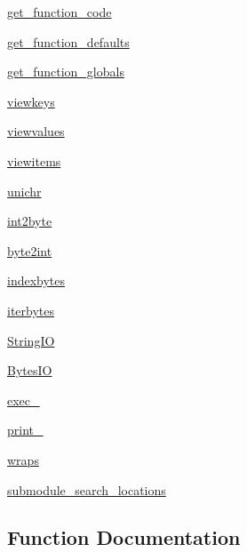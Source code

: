 \begin{DoxyCompactItemize}
\item 
\hyperlink{namespacesix_a17cf3556b07a902733cf8694ccc8c620}{get\+\_\+function\+\_\+code}
\item 
\hyperlink{namespacesix_ad0b187b39865ce712b907f81e1f0d744}{get\+\_\+function\+\_\+defaults}
\item 
\hyperlink{namespacesix_acccb7a0407196b6b1fe0ce76ba93d7a7}{get\+\_\+function\+\_\+globals}
\item 
\hyperlink{namespacesix_ad2206e5e921294fa8eb626bc615e0395}{viewkeys}
\item 
\hyperlink{namespacesix_a71eb4fded7f75b30633e42a157585284}{viewvalues}
\item 
\hyperlink{namespacesix_abb1f58c1fd2e77496261e70f4ce871d6}{viewitems}
\item 
\hyperlink{namespacesix_a32dbc25df1cde32d5c59d7cbfa63ddc1}{unichr}
\item 
\hyperlink{namespacesix_a84f0a486bede297c97d3534c8592673f}{int2byte}
\item 
\hyperlink{namespacesix_a34d8d61488b379c61fb59c77498ce964}{byte2int}
\item 
\hyperlink{namespacesix_a3e356fc8418cb6c1df6fe533ed89c10b}{indexbytes}
\item 
\hyperlink{namespacesix_a9d56337c7613cdf4505f4bf4e99a52e1}{iterbytes}
\item 
\hyperlink{namespacesix_a1875e440165f8faa30af1c2de2215ae8}{String\+IO}
\item 
\hyperlink{namespacesix_afa02f81e3e5ce3921aeb6dc286912fac}{Bytes\+IO}
\item 
\hyperlink{namespacesix_a1c4aa7a48cca4717210b1cdd75680a50}{exec\+\_\+}
\item 
\hyperlink{namespacesix_aa26b05c4e07d049588324108a8a1cdd8}{print\+\_\+}
\item 
\hyperlink{namespacesix_a39b5267223b387d63a745c96650cf61b}{wraps}
\item 
\hyperlink{namespacesix_a37c02ba6442235417d3f2b668ba7a4b3}{submodule\+\_\+search\+\_\+locations}
\end{DoxyCompactItemize}


\subsection{Function Documentation}
\mbox{\label{namespacesix_ac92c20d6dc6979883b76fc6cf43f44b8}} 
